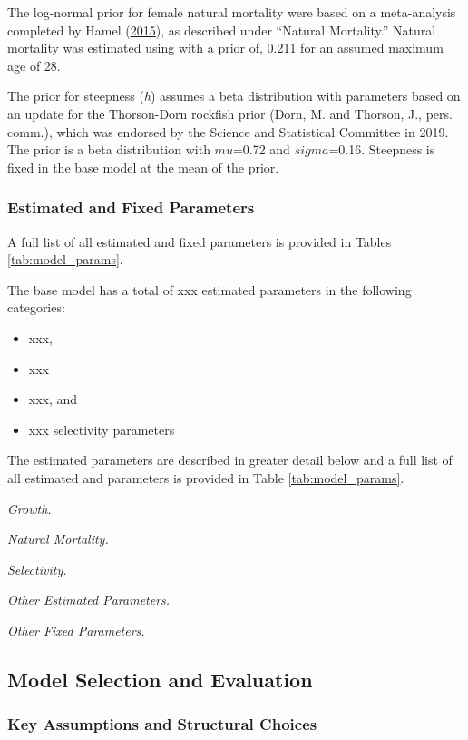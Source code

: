 \documentclass[12pt,]{article}
\begin{document}
The log-normal prior for female natural mortality were based on a
meta-analysis completed by Hamel
(\protect\hyperlink{ref-Hamel2015}{2015}), as described under ``Natural
Mortality.'' Natural mortality was estimated using with a prior of,
0.211 for an assumed maximum age of 28.

The prior for steepness (\emph{h}) assumes a beta distribution with
parameters based on an update for the Thorson-Dorn rockfish prior (Dorn,
M. and Thorson, J., pers. comm.), which was endorsed by the Science and
Statistical Committee in 2019. The prior is a beta distribution with
\(mu\)=0.72 and \(sigma\)=0.16. Steepness is fixed in the base model at
the mean of the prior.

\subsubsection{Estimated and Fixed
Parameters}\label{estimated-and-fixed-parameters}

A full list of all estimated and fixed parameters is provided in Tables
\ref{tab:model_params}.

The base model has a total of xxx estimated parameters in the following
categories:

\begin{itemize}
  \item xxx,
  \item xxx
  \item xxx, and
  \item xxx selectivity parameters
\end{itemize}

The estimated parameters are described in greater detail below and a
full list of all estimated and parameters is provided in Table
\ref{tab:model_params}.

\emph{Growth.}

\emph{Natural Mortality.}

\emph{Selectivity.}

\emph{Other Estimated Parameters.}

\emph{Other Fixed Parameters.}

\subsection{Model Selection and
Evaluation}\label{model-selection-and-evaluation}

\subsubsection{Key Assumptions and Structural
Choices}\label{key-assumptions-and-structural-choices}
\end{document}

